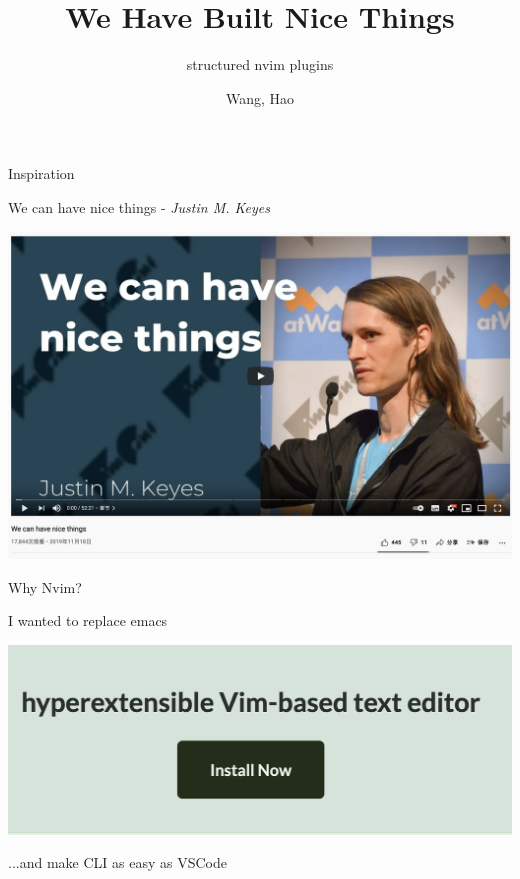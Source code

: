 \documentclass{beamer}
\title{We Have Built Nice Things}
\subtitle{structured nvim plugins}
\author{Wang, Hao}
\institute{Lead Engineer @ Graveflex | ms-jpq @ github | hola@bigly.dog}
\date{}
\begin{document}
\begin{frame}


	\titlepage

\end{frame}


\begin{frame}{Inspiration}

	We can have nice things - \textit{Justin M. Keyes}

	\vspace{1em}

	\includegraphics[width=\textwidth]{we_can_have_nice}

\end{frame}


\begin{frame}{Why Nvim?}

	I wanted to replace emacs

	\vspace{1em}

	\includegraphics[width=\textwidth]{home_page}

	\vspace{1em}

	...and make CLI as easy as VSCode

\end{frame}
\end{document}
